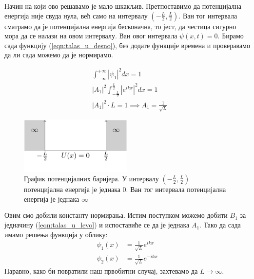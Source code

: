 \documentclass{tufte-handout} %
\theoremstyle{definition}
\theoremstyle{remark}
\begin{document}
Начин на који ово решавамо је мало шкакљив. Претпоставимо да потенцијална енергија није свуда нула, већ само на интервалу $(-\frac{L}{2},\frac{L}{2})$. Ван тог интервала сматрамо да је потенцијална енергија бесконачна, то јест, да честица сигурно мора да се налази на овом интервалу. Ван овог интервала $\psi(x,t)=0$. Бирамо сада функцију (\ref{eqn:talas_u_desno}), без додате функције времена и проверавамо да ли сада можемо да је нормирамо.

\begin{align*}
	&\displaystyle\int_{-\infty}^{+\infty}|\psi_1|^2dx =1\\
	&\displaystyle|A_1|^2\int_{-\frac{L}{2}}^{\frac{L}{2}}|e^{ikx}|^2dx= 1\\
	&|A_1|^2 \cdot L = 1 \implies A_1 = \frac{1}{\sqrt{L}}
\end{align*}
\begin{figure}
	\centering
	\includegraphics[width=0.5\textwidth]{beskonacne_barijere.png}
	\caption{График потенцијалних баријера. У интервалу $\left(-\frac{L}{2}, \frac{L}{2}\right)$ потенцијална енергија је једнака 0. Ван тог интервала потенцијална енергија је једнака $\infty$}
\end{figure}
Овим смо добили константу нормирања. Истим поступком можемо добити $B_1$ за једначину (\ref{eqn:talas_u_levo}) и испоставиће се да је једнака $A_1$. Тако да сада имамо решења функција у облику:
\begin{align}
		\psi_1(x)&=\frac{1}{\sqrt{L}}e^{ikx}\\
		\psi_2(x)&=\frac{1}{\sqrt{L}}e^{-ikx} 
\end{align}
Наравно, како би повратили наш првобитни случај, захтевамо да $L\rightarrow\infty$. 
\end{document}

